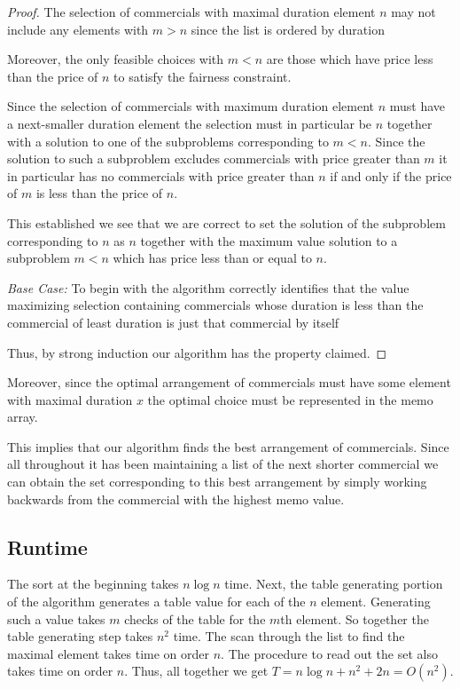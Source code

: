 \documentclass{article}
\begin{document}
\begin{proof}
The selection of commercials with maximal duration element $n$ may not include any elements with $m>n$ since the list is ordered by duration

Moreover, the only feasible choices with $m<n$ are those which have price less than the price of $n$ to satisfy the fairness constraint.

Since the selection of commercials with maximum duration element $n$ must have a next-smaller duration element the selection must in particular be $n$ together with a solution to one of the subproblems corresponding to $m<n$. Since the solution to such a subproblem excludes commercials with price greater than $m$ it in particular has no commercials with price greater than $n$ if and only if the price of $m$ is less than the price of $n$. 

This established we see that we are correct to set the solution of the subproblem corresponding to $n$ as $n$ together with the maximum value solution to a subproblem $m<n$ which has price less than or equal to $n$.

\emph{Base Case: } To begin with the algorithm correctly identifies that the value maximizing selection containing commercials whose duration is less than the commercial of least duration is just that commercial by itself

Thus, by strong induction our algorithm has the property claimed.
\end{proof}

Moreover, since the optimal arrangement of commercials must have some element with maximal duration $x$ the optimal choice must be represented in the memo array. 

This implies that our algorithm finds the best arrangement of commercials. Since all throughout it has been maintaining a list of the next shorter commercial we can obtain the set corresponding to this best arrangement by simply working backwards from the commercial with the highest memo value.


\subsection{Runtime}
The sort at the beginning takes $n\log{n}$ time. Next, the table generating portion of the algorithm generates a table value for each of the $n$ element. Generating such a value takes $m$ checks of the table for the $m$th element. So together the table generating step takes $n^2$ time. The scan through the list to find the maximal element takes time on order $n$. The procedure to read out the set also takes time on order $n$. Thus, all together we get $T= n\log{n}+n^2+2n =O(n^2)$.
\end{document}
